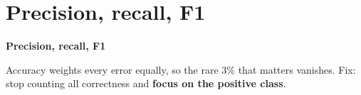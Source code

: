 \documentclass[aspectratio=169]{beamer}
\begin{document}
\section{Precision, recall, F1}

\begin{frame}[plain]
  \vfill
  \begin{center}
    {\Large\color{popblue}\textbf{Precision, recall, F1}}\\[0.9em]
    \begin{minipage}{0.82\textwidth}\centering\small
      Accuracy weights every error equally, so the rare $3\%$ that matters vanishes.
      Fix: stop counting all correctness and \textbf{focus on the positive class}.
    \end{minipage}
  \end{center}
  \vfill
\end{frame}
\end{document}
